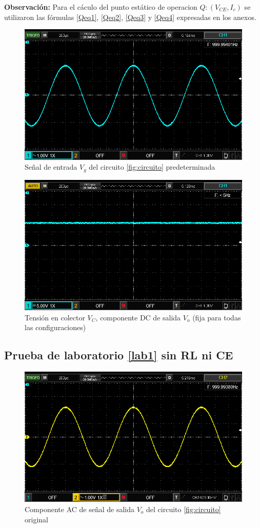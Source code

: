 \documentclass[12pt, a4paper]{article}
\begin{document}
    {\bf Observación:} Para el cáculo del punto estático de operacion $Q : (V_{CE},I_c)$ se utilizaron las fórmulas \eqref{Qeq1}, \eqref{Qeq2}, \eqref{Qeq3} y \eqref{Qeq4} expresadas en los anexos.

    \begin{figure}[h!]
        \centering
        \includegraphics[height=5cm\textwidth]{Vg.png}
        \caption{Señal de entrada $V_g$ del circuito \ref{fig:circuito} predeterminada}
        \label{fig:vg}
    \end{figure}

    \begin{figure}[h!]
        \centering
        \includegraphics[height=5cm\textwidth]{VC.png}
        \caption{Tensión en colector $V_C$, componente DC de salida $V_o$ (fija para todas las configuraciones)}
        \label{fig:vc}
    \end{figure}

    \newpage

    \subsection{Prueba de laboratorio \ref{lab1} sin RL ni CE}

    \begin{figure}[h!]
        \centering
        \includegraphics[height=5cm\textwidth]{VosRLsCE.png}
        \caption{Componente AC de señal de salida $V_o$ del circuito \ref{fig:circuito} original}
        \label{fig:voac}
    \end{figure}
\end{document}
